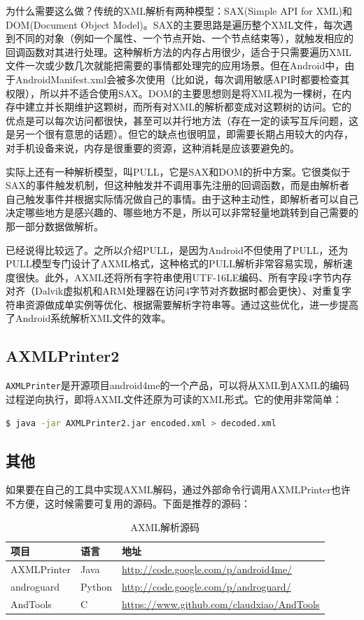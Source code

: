 为什么需要这么做？传统的XML解析有两种模型：SAX(Simple API for XML)和DOM(Document Object Model)。SAX的主要思路是遍历整个XML文件，每次遇到不同的对象（例如一个属性、一个节点开始、一个节点结束等），就触发相应的回调函数对其进行处理。这种解析方法的内存占用很少，适合于只需要遍历XML文件一次或少数几次就能把需要的事情都处理完的应用场景。但在Android中，由于AndroidManifest.xml会被多次使用（比如说，每次调用敏感API时都要检查其权限），所以并不适合使用SAX。DOM的主要思想则是将XML视为一棵树，在内存中建立并长期维护这颗树，而所有对XML的解析都变成对这颗树的访问。它的优点是可以每次访问都很快，甚至可以并行地方法（存在一定的读写互斥问题，这是另一个很有意思的话题）。但它的缺点也很明显，即需要长期占用较大的内存，对手机设备来说，内存是很重要的资源，这种消耗是应该要避免的。

实际上还有一种解析模型，叫PULL\cite{url:xmlpull}，它是SAX和DOM的折中方案。它很类似于SAX的事件触发机制，但这种触发并不调用事先注册的回调函数，而是由解析者自己触发事件并根据实际情况做自己的事情。由于这种主动性，即解析者可以自己决定哪些地方是感兴趣的、哪些地方不是，所以可以非常轻量地跳转到自己需要的那一部分数据做解析。

已经说得比较远了。之所以介绍PULL，是因为Android不但使用了PULL，还为PULL模型专门设计了AXML格式，这种格式的PULL解析非常容易实现，解析速度很快。此外，AXML还将所有字符串使用UTF-16LE编码、所有字段4字节内存对齐（Dalvik虚拟机和ARM处理器在访问4字节对齐数据时都会更快）、对重复字符串资源做成单实例等优化、根据需要解析字符串等。通过这些优化，进一步提高了Android系统解析XML文件的效率。

\subsection{AXMLPrinter2}
\lstinline!AXMLPrinter!是开源项目android4me\cite{url:android4me}的一个产品，可以将从XML到AXML的编码过程逆向执行，即将AXML文件还原为可读的XML形式。它的使用非常简单：
\begin{lstlisting}[language=bash, numbers=none]
 $ java -jar AXMLPrinter2.jar encoded.xml > decoded.xml
\end{lstlisting}

\subsection{其他}
如果要在自己的工具中实现AXML解码，通过外部命令行调用AXMLPrinter也许不方便，这时候需要可复用的源码。下面是推荐的源码：

\begin{table}[htbp]
  \caption{AXML解析源码}
  \centering
  \begin{tabular}{lll}
    \toprule
    项目 & 语言 & 地址 \\
    \midrule
    AXMLPrinter & Java & \url{http://code.google.com/p/android4me/} \\
    androguard & Python &  \url{http://code.google.com/p/androguard/}\\
    AndTools & C & \url{https://www.github.com/claudxiao/AndTools} \\
    \bottomrule
  \end{tabular}
\end{table}

